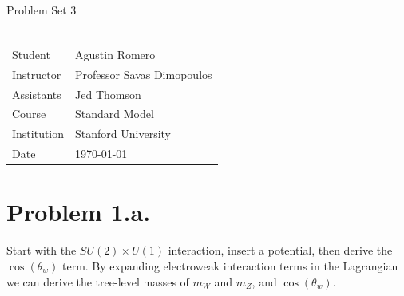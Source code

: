 \documentclass{article}
\begin{document}
\begin{center}
{\Large{Problem Set 3}}\\~\\
\begin{tabular}{l l}
Student&Agustin Romero\\
Instructor&Professor Savas Dimopoulos\\
Assistants&Jed Thomson\\
Course&Standard Model\\
Institution&Stanford University\\
Date&\today\\
\end{tabular}
\end{center}
\section*{Problem 1.a.}
Start with the $SU(2)\times U(1)$ interaction, insert a potential, then derive the $\cos(\theta_w)$ term.
By expanding electroweak interaction terms in the Lagrangian we can derive the tree-level masses of $m_W$ and $m_Z$, and $\cos(\theta_w)$.
\end{document}
